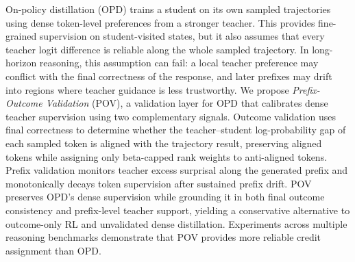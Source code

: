 On-policy distillation (OPD) trains a student on its own sampled trajectories using dense token-level preferences from a stronger teacher. This provides fine-grained supervision on student-visited states, but it also assumes that every teacher logit difference is reliable along the whole sampled trajectory. In long-horizon reasoning, this assumption can fail: a local teacher preference may conflict with the final correctness of the response, and later prefixes may drift into regions where teacher guidance is less trustworthy. We propose \emph{Prefix-Outcome Validation} (POV), a validation layer for OPD that calibrates dense teacher supervision using two complementary signals. Outcome validation uses final correctness to determine whether the teacher--student log-probability gap of each sampled token is aligned with the trajectory result, preserving aligned tokens while assigning only beta-capped rank weights to anti-aligned tokens. Prefix validation monitors teacher excess surprisal along the generated prefix and monotonically decays token supervision after sustained prefix drift. POV preserves OPD's dense supervision while grounding it in both final outcome consistency and prefix-level teacher support, yielding a conservative alternative to outcome-only RL and unvalidated dense distillation. Experiments across multiple reasoning benchmarks demonstrate that POV provides more reliable credit assignment than OPD.
